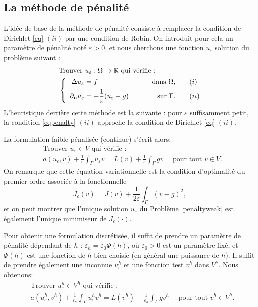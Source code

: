 \documentclass[11pt]{book}
\def\n{{\bf n}}
\newcommand{\eps}{\varepsilon}
\newcommand{\R}{\mathbb{R}}
\newcommand{\dnu}{\partial_{\n} u}
\begin{document}
\subsection{La méthode de pénalité}

L'idée de base de la méthode de pénalité \cite{babuska-73b,barrett-elliott-86} 
consiste à remplacer la condition de Dirichlet \eqref{eq} $(ii)$ par une condition de Robin.
On introduit pour cela un paramètre de pénalité noté $\eps > 0$, et nous cherchons une fonction $u_\eps$ solution du problème suivant :
\begin{align} 
\label{eqpenalty}
&\textrm{Trouver } u_\eps : \Omega \rightarrow \R \textrm{ qui vérifie :}\nonumber\\
&\left\{
\begin{aligned}
 -\Delta u_\eps &= f   &\qquad \hbox{ dans } \Omega,  &\qquad (i)\\ 
\dnu_\eps &= - \frac1\eps (u_\eps-g) &\qquad \hbox{ sur } \Gamma.&\qquad (ii) 
\end{aligned}
\right.
\end{align}
L'heuristique derrière cette méthode est la suivante : pour $\eps$ suffisamment petit, la condition \eqref{eqpenalty} $(ii)$ approche la condition de Dirichlet \eqref{eq} $(ii)$. 

La formulation faible pénalisée (continue) s'écrit alors:
\begin{align} 
\label{penaltyweak}
&\textrm{Trouver } u_\eps \in V \textrm{ qui vérifie :}\nonumber\\
&%
a(u_\eps,v) + \frac1\eps \int_\Gamma u_\eps v  = L(v) 
+ \frac1\eps \int_\Gamma g v 
\quad \textrm{ pour tout } v \in V.
\end{align}
On remarque que cette équation variationnelle est la condition d'optimalité du premier ordre associée à la fonctionnelle
\[
J_\eps ( v) = J ( v ) + \frac1{2\eps} \int_\Gamma (v-g)^2, 
\]
et on peut montrer que l'unique solution $u_\eps$ du Problème \eqref{penaltyweak} est également l'unique minimiseur de $J_\eps (\cdot)$.

Pour obtenir une formulation discrétisée, il suffit de prendre un paramètre de pénalité dépendant de $h$ : $\eps_h = \eps_0 \Phi (h)$, où $\eps_0 > 0$ est un paramètre fixé, et $\Phi(h)$ est une fonction de $h$ bien choisie (en général une puissance de $h$). Il suffit de prendre également une inconnue $u_\eps^h$ et une fonction test $v^h$ dans $V^h$. Nous obtenons:
\begin{align} 
\label{penaltyweakh}
&\textrm{Trouver } u^h_\eps \in V^h \textrm{ qui vérifie :}\nonumber\\
&%
a(u^h_\eps,v^h) + \frac1{\eps_h} \int_\Gamma u_\eps^h v^h  = L(v^h) 
+ \frac1{\eps_h} \int_\Gamma g v^h 
\quad \textrm{ pour tout } v^h \in V^h.
\end{align}
\end{document}
